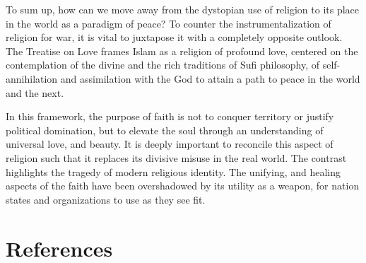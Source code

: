 \documentclass[12pt]{article}
\begin{document}
\vspace{2em}

To sum up, how can we move away from the dystopian use of religion to its place in the world as a paradigm of peace? To counter the instrumentalization of religion for war, it is vital to juxtapose it with a completely opposite outlook. The Treatise on Love frames Islam as a religion of profound love, centered on the contemplation of the divine and the rich traditions of Sufi philosophy, of self-annihilation and assimilation with the God to attain a path to peace in the world and the next.

In this framework, the purpose of faith is not to conquer territory or justify political domination, but to elevate the soul through an understanding of universal love, and beauty. It is deeply important to reconcile this aspect of religion such that it replaces its divisive misuse in the real world. The contrast highlights the tragedy of modern religious identity. The unifying, and healing aspects of the faith have been overshadowed by its utility as a weapon, for nation states and organizations to use as they see fit.

\vspace{2em}

\section*{References}
\end{document}
